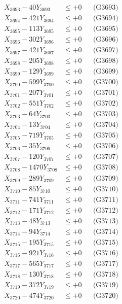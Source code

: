 \documentclass[a4paper,10pt]{article}
\begin{document}
{\begin{align}
X_{3693} - 40Y_{3693} &\leq +0 && \text{(G3693)} \\
X_{3694} - 421Y_{3694} &\leq +0 && \text{(G3694)} \\
X_{3695} - 113Y_{3695} &\leq +0 && \text{(G3695)} \\
X_{3696} - 302Y_{3696} &\leq +0 && \text{(G3696)} \\
X_{3697} - 421Y_{3697} &\leq +0 && \text{(G3697)} \\
X_{3698} - 205Y_{3698} &\leq +0 && \text{(G3698)} \\
X_{3699} - 129Y_{3699} &\leq +0 && \text{(G3699)} \\
X_{3700} - 599Y_{3700} &\leq +0 && \text{(G3700)} \\
\allowbreak
X_{3701} - 207Y_{3701} &\leq +0 && \text{(G3701)} \\
X_{3702} - 551Y_{3702} &\leq +0 && \text{(G3702)} \\
X_{3703} - 64Y_{3703} &\leq +0 && \text{(G3703)} \\
X_{3704} - 13Y_{3704} &\leq +0 && \text{(G3704)} \\
X_{3705} - 719Y_{3705} &\leq +0 && \text{(G3705)} \\
X_{3706} - 35Y_{3706} &\leq +0 && \text{(G3706)} \\
X_{3707} - 120Y_{3707} &\leq +0 && \text{(G3707)} \\
X_{3708} - 1470Y_{3708} &\leq +0 && \text{(G3708)} \\
X_{3709} - 289Y_{3709} &\leq +0 && \text{(G3709)} \\
X_{3710} - 85Y_{3710} &\leq +0 && \text{(G3710)} \\
\allowbreak
X_{3711} - 741Y_{3711} &\leq +0 && \text{(G3711)} \\
X_{3712} - 171Y_{3712} &\leq +0 && \text{(G3712)} \\
X_{3713} - 48Y_{3713} &\leq +0 && \text{(G3713)} \\
X_{3714} - 94Y_{3714} &\leq +0 && \text{(G3714)} \\
X_{3715} - 195Y_{3715} &\leq +0 && \text{(G3715)} \\
X_{3716} - 921Y_{3716} &\leq +0 && \text{(G3716)} \\
X_{3717} - 565Y_{3717} &\leq +0 && \text{(G3717)} \\
X_{3718} - 130Y_{3718} &\leq +0 && \text{(G3718)} \\
X_{3719} - 372Y_{3719} &\leq +0 && \text{(G3719)} \\
X_{3720} - 474Y_{3720} &\leq +0 && \text{(G3720)} \\

\end{align}}
\end{document}
